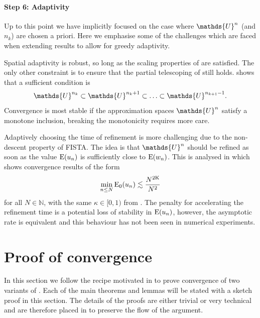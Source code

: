 \documentclass[10pt,a4paper,onecolumn]{article}
\numberwithin{equation}{section}
\let\F\mathds\let\C\mathcal\newcommand{\R}{\F{R}}\newcommand{\A}{\C{A}}
\newcommand{\op}[1]{\operatorname{#1}}\newcommand{\overtext}[2]{\stackrel{\text{#1}}{#2}}
\newcounter{adaptStepCounter}
\newenvironment{adaptiveStep}{\refstepcounter{adaptStepCounter}}{}
\newcommand*{\Func}[1]{%
	\IfEqCase{#1}{%
		{0}{\op{E}}%
		{1}{\op{F}}%
		{2}{\op{G}}%
		{3}{\op{H}}%
	}[\op{F}#1]%
}
\newcommand*{\varf}[1]{%
	\IfEqCase{#1}{%
		{0}{u}%
		{1}{v}%
		{2}{w}%
	}[u#1]%
}
\newcommand*{\spcf}[1]{%
	\IfEqCase{#1}{%
		{0}{\F{U}}%
		{1}{\F{V}}%
		{2}{\F{W}}%
	}[\F{U}#1]%
}
\begin{document}
\paragraph{Step 6: Adaptivity}
\begin{adaptiveStep}\label{step: step 6 adaptivity}
	Up to this point we have implicitly focused on the case where $\spcf0^n$ (and $n_k$) are chosen a priori. Here we emphasise some of the challenges which are faced when extending results to allow for greedy adaptivity.
	
	Spatial adaptivity is robust, so long as the scaling properties of  are satisfied. The only other constraint is to ensure that the partial telescoping of  still holds.  shows that a sufficient condition is
	$$\spcf0^{n_k}\subset\spcf0^{n_k+1}\subset\ldots\subset\spcf0^{n_{k+1}-1}.$$
	Convergence is most stable if the approximation spaces $\spcf0^n$ satisfy a monotone inclusion, breaking the monotonicity requires more care.
	
	Adaptively choosing the time of refinement is more challenging due to the non-descent property of FISTA. The idea is that $\spcf0^n$ should be refined as soon as the value $\Func0(\varf0_n)$ is sufficiently close to $\Func0(\varf2_n)$. This is analysed in  which shows convergence results of the form
	$$ \min_{n\leq N}\Func0_0(\varf0_n) \lesssim \frac{N^{2\kappa}}{N^2}$$
	for all $N\in\F N$, with the same $\kappa\in[0,1)$ from . The penalty for accelerating the refinement time is a potential loss of stability in $\Func0(\varf0_n)$, however, the asymptotic rate is equivalent and this behaviour has not been seen in numerical experiments.
\end{adaptiveStep}

\section{Proof of convergence}\label{sec: FISTA convergence}
In this section we follow the recipe motivated in  to prove convergence of two variants of . Each of the main theorems and lemmas will be stated with a sketch proof in this section. The details of the proofs are either trivial or very technical and are therefore placed in  to preserve the flow of the argument.
\end{document}
